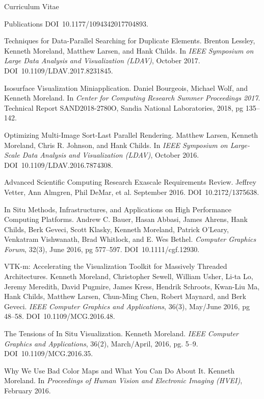 \documentclass{article}
\begin{document}
\begin{cv}{Curriculum Vitae}
\begin{cvlist}{Publications}
      DOI~10.1177/1094342017704893.
    \item[Techniques for Data-Parallel Searching for Duplicate Elements.]
      Brenton Lessley, Kenneth Moreland, Matthew Larsen, and Hank Childs.
      In \emph{IEEE Symposium on Large Data Analysis and Visualization (LDAV)}, October 2017.
      DOI~10.1109/LDAV.2017.8231845.
    \item[Isosurface Visualization Miniapplication.]
      Daniel Bourgeois, Michael Wolf, and Kenneth Moreland.
      In \emph{Center for Computing Research Summer Proceedings 2017}.
      Technical Report SAND2018-2780O, Sandia National Laboratories, 2018, pg 135--142. 
    \item[Optimizing Multi-Image Sort-Last Parallel Rendering.]
      Matthew Larsen, Kenneth Moreland, Chris R. Johnson, and Hank Childs.
      In \emph{IEEE Symposium on Large-Scale Data Analysis and Visualization (LDAV)}, October 2016.
      DOI~10.1109/LDAV.2016.7874308.
    \item[Advanced Scientific Computing Research Exascale Requirements Review.]
      Jeffrey Vetter, Ann Almgren, Phil DeMar, et al.
      September 2016.
      DOI~10.2172/1375638.
    \item[In Situ Methods, Infrastructures, and Applications on High Performance]~\\ Computing Platforms.
      Andrew C. Bauer, Hasan Abbasi, James Ahrens, Hank Childs, Berk Geveci, Scott Klasky, Kenneth Moreland, Patrick O'Leary, Venkatram Vishwanath, Brad Whitlock, and E. Wes Bethel.
      \emph{Computer Graphics Forum}, 32(3), June 2016, pg 577--597.
      DOI~10.1111/cgf.12930.
    \item[VTK-m: Accelerating the Visualization Toolkit for Massively Threaded]~\\ Architectures.
      Kenneth Moreland, Christopher Sewell, William Usher, Li-ta Lo, Jeremy Meredith, David Pugmire, James Kress, Hendrik Schroots, Kwan-Liu Ma, Hank Childs, Matthew Larsen, Chun-Ming Chen, Robert Maynard, and Berk Geveci.
      \emph{IEEE Computer Graphics and Applications}, 36(3), May/June 2016, pg 48--58.
      DOI~10.1109/MCG.2016.48.
    \item[The Tensions of In Situ Visualization.]
      Kenneth Moreland.
      \emph{IEEE Computer Graphics and Applications}, 36(2), March/April, 2016, pg. 5--9.
      DOI~10.1109/MCG.2016.35.
    \item[Why We Use Bad Color Maps and What You Can Do About It.]
      Kenneth Moreland.
      In \emph{Proceedings of Human Vision and Electronic Imaging (HVEI)}, February 2016.

\end{cvlist}
\end{cv}
\end{document}
